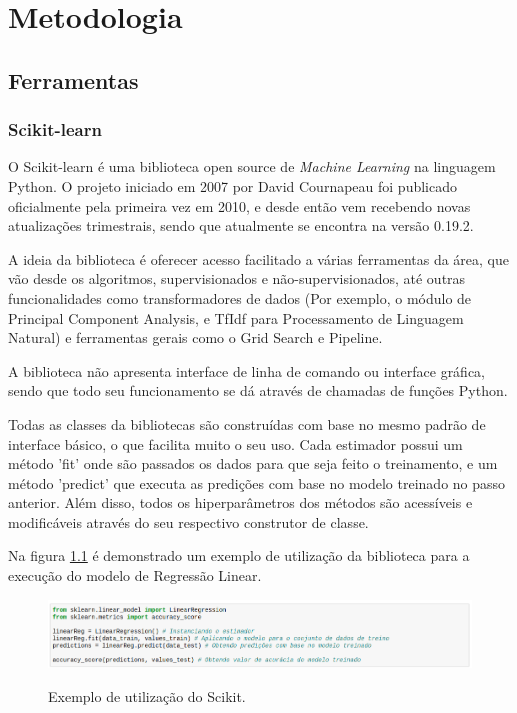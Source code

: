 \chapter{Metodologia}
\label{c.metodologia}

\section{Ferramentas}
\label{s.ferramentas}

\subsection{Scikit-learn}
\label{ss.scikit}

O Scikit-learn é uma biblioteca open source de \textit{Machine Learning} na linguagem Python. O projeto iniciado em 2007 por David Cournapeau foi publicado oficialmente pela primeira vez em 2010, e desde então vem recebendo novas atualizações trimestrais, sendo que atualmente se encontra na versão 0.19.2. \cite{sklearn_api}

A ideia da biblioteca é oferecer acesso facilitado a várias ferramentas da área, que vão desde os algoritmos, supervisionados e não-supervisionados, até outras funcionalidades como transformadores de dados (Por exemplo, o módulo de Principal Component Analysis, e TfIdf para Processamento de Linguagem Natural) e ferramentas gerais como o Grid Search e Pipeline. \cite{scikit-learn}

A biblioteca não apresenta interface de linha de comando ou interface gráfica, sendo que todo seu funcionamento se dá através de chamadas de funções Python. 

Todas as classes da bibliotecas são construídas com base no mesmo padrão de interface básico, o que facilita muito o seu uso. Cada estimador possui um método 'fit' onde são passados os dados para que seja feito o treinamento, e um método 'predict' que executa as predições com base no modelo treinado no passo anterior. Além disso, todos os hiperparâmetros dos métodos são acessíveis e modificáveis através do seu respectivo construtor de classe.


Na figura \ref{f.exemplo-scikit} é demonstrado um exemplo de utilização da biblioteca para a execução do modelo de Regressão Linear.

\begin{figure}[h]
\caption{\small Exemplo de utilização do Scikit.}
\centering
\includegraphics[scale=0.55]{figs/exemplo-scikit.png}
\label{f.exemplo-scikit}
\end{figure}


